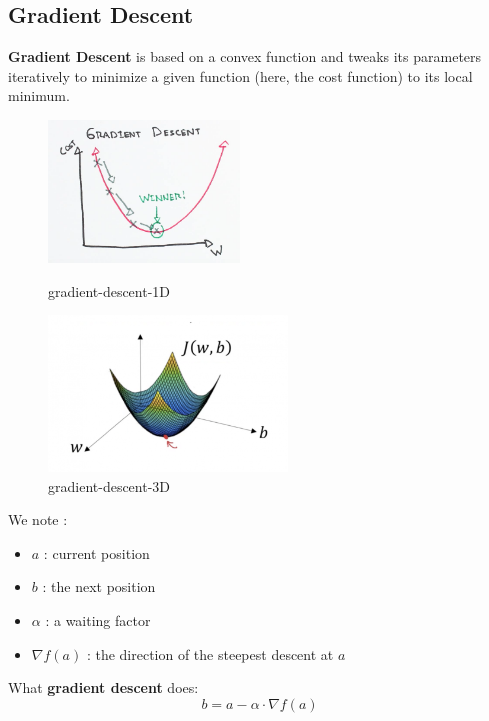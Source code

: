 \documentclass[11pt, a4paper]{article}
\begin{document}
\subsection{Gradient Descent}

\textbf{Gradient Descent} is based on a convex function and tweaks its parameters iteratively to minimize a given function (here, the cost function) to its local minimum.
\begin{figure}[H]
\begin{minipage}[t]{0.5\linewidth} 
\centering 
\includegraphics[width=2.0in]{./fig/gradient-descent-1D.png} 
\caption{gradient-descent-1D} 
\label{fig:gradient-descent-1D} 
\end{minipage}%
\begin{minipage}[t]{0.5\linewidth} 
\centering 
\includegraphics[width=2.5in]{./fig/gradient-descent-3D.png} 
\caption{gradient-descent-3D} 
\label{fig:gradient-descent-3D} 
\end{minipage} 
\end{figure}

We note :
\begin{itemize}
    \item $a$ : current position
    \item $b$ : the next position
    \item $\alpha$ : a waiting factor
    \item $\nabla  f(a)$ : the direction of the steepest descent at $a$
\end{itemize}
\begin{tcolorbox}
    What \textbf{gradient descent} does:
    \[
        b = a - \alpha \cdot \nabla f(a)
    \]
\end{tcolorbox}
\end{document}
